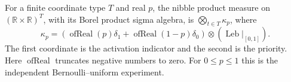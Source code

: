 \begin{definition}
For a finite coordinate type $T$ and real $p$, the nibble product measure
on $(\mathbb R\times\mathbb R)^T$, with its Borel product sigma algebra,
is $\bigotimes_{t\in T}\kappa_p$, where
\[
\kappa_p=(\operatorname{ofReal}(p)\delta_1+
\operatorname{ofReal}(1-p)\delta_0)\otimes
 (\operatorname{Leb}|_{[0,1]}).
\]
The first coordinate is the activation indicator and the second is the
priority. Here $\operatorname{ofReal}$ truncates negative numbers to zero.
For $0\le p\le1$ this is the independent Bernoulli--uniform experiment.
\end{definition}
